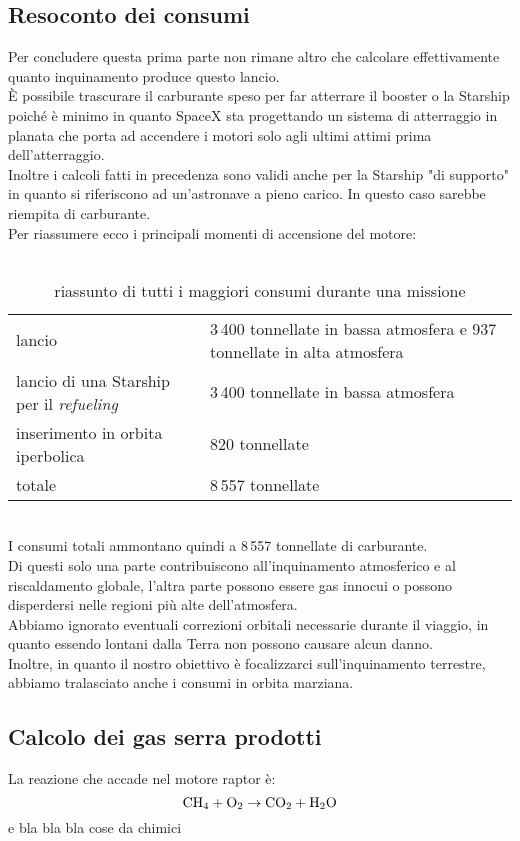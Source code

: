 \subsection{Resoconto dei consumi}
Per concludere questa prima parte non rimane altro che calcolare effettivamente quanto inquinamento produce questo lancio.\\
È possibile trascurare il carburante speso per far atterrare il booster o la Starship poiché è minimo in quanto SpaceX sta progettando un sistema di atterraggio in planata che porta ad accendere i motori solo agli ultimi attimi prima dell'atterraggio.\\
Inoltre i calcoli fatti in precedenza sono validi anche per la Starship "di supporto" in quanto si riferiscono ad un'astronave a pieno carico. In questo caso sarebbe riempita di carburante.\\
Per riassumere ecco i principali momenti di accensione del motore:\\
\\
\begin{table}[h!]
\centering
\label{tablella consumi}

\begin{tabular}{|l|l|}
    \hline
    lancio & 3\,400 tonnellate in bassa atmosfera e 937 tonnellate in alta atmosfera  \\
    lancio di una Starship per il \textit{refueling} & 3\,400 tonnellate in bassa atmosfera  \\
    inserimento in orbita iperbolica & 820 tonnellate \\
    \hline
    totale & 8\,557 tonnellate \\
    \hline
    
\end{tabular}
\caption{riassunto di tutti i maggiori consumi durante una missione}
\end{table}\\
I consumi totali ammontano quindi a 8\,557 tonnellate di carburante.\\ Di questi solo una parte contribuiscono all'inquinamento atmosferico e al riscaldamento globale, l'altra parte possono essere gas innocui o possono disperdersi nelle regioni più alte dell'atmosfera.\\
Abbiamo ignorato eventuali correzioni orbitali necessarie durante il viaggio, in quanto essendo lontani dalla Terra non possono causare alcun danno.\\
Inoltre, in quanto il nostro obiettivo è focalizzarci sull'inquinamento terrestre, abbiamo tralasciato anche i consumi in orbita marziana.
\subsection{Calcolo dei gas serra prodotti}
La reazione che accade nel motore raptor è:
$$
\ce{CH4} + \ce{O2} \rightarrow \ce{CO2} + \ce{H2O}
$$
e bla bla bla cose da chimici